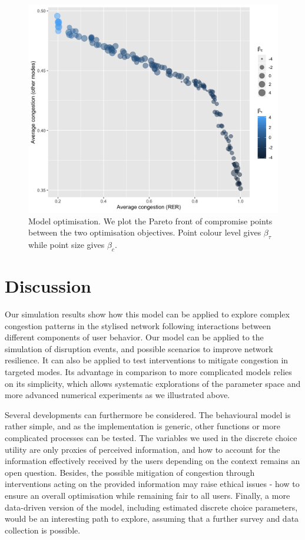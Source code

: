 \documentclass[3p,times,procedia]{elsarticle}
\begin{document}
\begin{figure}%
\centerline{\includegraphics[width=0.75\linewidth]{figures/Fig4.png}}
\caption{Model optimisation. We plot the Pareto front of compromise points between the two optimisation objectives. Point colour level gives $\beta_{\tau}$ while point size gives $\beta_c$.\label{fig:fig4}}
\end{figure}

\section{Discussion}


Our simulation results show how this model can be applied to explore complex congestion patterns in the stylised network following interactions between different components of user behavior. Our model can be applied to the simulation of disruption events, and possible scenarios to improve network resilience. It can also be applied to test interventions to mitigate congestion in targeted modes. Its advantage in comparison to more complicated models relies on its simplicity, which allows systematic explorations of the parameter space and more advanced numerical experiments as we illustrated above.

Several developments can furthermore be considered. The behavioural model is rather simple, and as the implementation is generic, other functions or more complicated processes can be tested. The variables we used in the discrete choice utility are only proxies of perceived information, and how to account for the information effectively received by the users depending on the context remains an open question. Besides, the possible mitigation of congestion through interventions acting on the provided information may raise ethical issues - how to ensure an overall optimisation while remaining fair to all users. Finally, a more data-driven version of the model, including estimated discrete choice parameters, would be an interesting path to explore, assuming that a further survey and data collection is possible.
\end{document}
